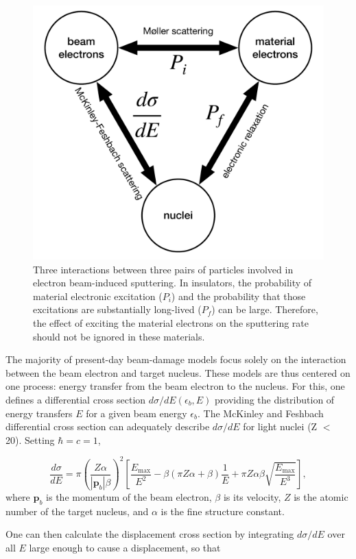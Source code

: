 \documentclass[twoside,twocolumn,9pt]{article}
\begin{document}
\begin{figure}
  \centering
  \includegraphics[width=.48\textwidth]{figures/triad.pdf}
  \caption{
    Three interactions between three pairs of particles involved in electron
    beam-induced sputtering.
    In insulators, the probability of material electronic excitation ($P_i$)
    and the probability that those excitations are substantially long-lived
    ($P_f$) can be large.
    Therefore, the effect of exciting the material electrons on the sputtering
    rate should not be ignored in these materials.
  }
  \label{fig:triad}
\end{figure}

The majority of present-day beam-damage models focus solely on the interaction
between the beam electron and target nucleus.
These models are thus centered on one process: energy transfer from the beam
electron to the nucleus.
For this, one defines a differential cross section $d\sigma/dE(\epsilon_b, E)$
providing the distribution of energy transfers $E$ for a given beam energy
$\epsilon_b$.
The McKinley and Feshbach differential cross section can adequately describe
$d\sigma/dE$
for light nuclei (Z $<$ 20).\cite{Mott1929, McKinley1948, Oen1973,
Egerton2010}  Setting $\hbar = c = 1$,

\begin{equation}
  \frac{d\sigma}{dE}
  =
  \pi\left(\frac{Z\alpha}{|\mathbf{p}_b|\beta}\right)^2
  \left[
    \frac{E_\text{max}}{E^2}
    - \beta(\pi Z\alpha+\beta)\frac{1}{E}
    + \pi Z\alpha\beta\sqrt{\frac{E_\text{max}}{E^3}}
  \right],
  \label{eq:MF}
\end{equation}
%
where $\mathbf{p}_b$ is the momentum of the beam electron, $\beta$ is its
velocity, $Z$ is the atomic number of the target nucleus, and $\alpha$ is the
fine structure constant.

One can then calculate the displacement cross section by integrating
$d\sigma/dE$ over all $E$ large enough to cause a displacement, so that
\end{document}
